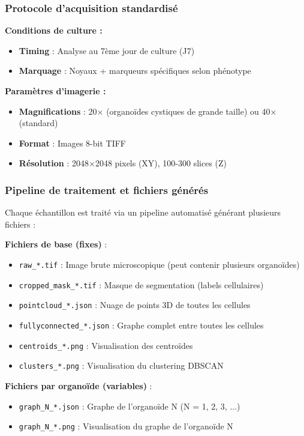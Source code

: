 \subsubsection{Protocole d'acquisition standardisé}

\textbf{Conditions de culture :}
\begin{itemize}
    \item \textbf{Timing} : Analyse au 7ème jour de culture (J7)
    \item \textbf{Marquage} : Noyaux + marqueurs spécifiques selon phénotype
\end{itemize}

\textbf{Paramètres d'imagerie :}
\begin{itemize}
    \item \textbf{Magnifications} : 20× (organoïdes cystiques de grande taille) ou 40× (standard)
    \item \textbf{Format} : Images 8-bit TIFF
    \item \textbf{Résolution} : 2048×2048 pixels (XY), 100-300 slices (Z)
\end{itemize}

\subsubsection{Pipeline de traitement et fichiers générés}

Chaque échantillon est traité via un pipeline automatisé générant plusieurs fichiers :

\textbf{Fichiers de base (fixes)} :
\begin{itemize}
    \item \texttt{raw\_*.tif} : Image brute microscopique (peut contenir plusieurs organoïdes)
    \item \texttt{cropped\_mask\_*.tif} : Masque de segmentation (labels cellulaires)
    \item \texttt{pointcloud\_*.json} : Nuage de points 3D de toutes les cellules
    \item \texttt{fullyconnected\_*.json} : Graphe complet entre toutes les cellules
    \item \texttt{centroids\_*.png} : Visualisation des centroïdes
    \item \texttt{clusters\_*.png} : Visualisation du clustering DBSCAN
\end{itemize}

\textbf{Fichiers par organoïde (variables)} :
\begin{itemize}
    \item \texttt{graph\_N\_*.json} : Graphe de l'organoïde N (N = 1, 2, 3, ...)
    \item \texttt{graph\_N\_*.png} : Visualisation du graphe de l'organoïde N
\end{itemize}

